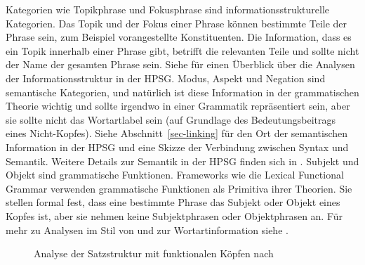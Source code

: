 %
Kategorien wie Topikphrase und Fokusphrase sind informationsstrukturelle Kategorien. Das
Topik und der Fokus einer Phrase können bestimmte Teile der Phrase sein, zum Beispiel vorangestellte Konstituenten. Die
Information, dass es ein Topik innerhalb einer Phrase gibt, betrifft die relevanten Teile und sollte nicht der Name der gesamten Phrase sein. Siehe
 für einen Überblick über die Analysen der Informationsstruktur in der HPSG. Modus,
Aspekt und Negation sind semantische Kategorien, und natürlich ist diese
Information in der grammatischen Theorie wichtig und sollte irgendwo in einer Grammatik repräsentiert sein, aber
sie sollte nicht das Wortartlabel sein (auf Grundlage des Bedeutungsbeitrags eines Nicht-Kopfes). Siehe Abschnitt~\ref{sec-linking} für den Ort der semantischen Information in
der HPSG und eine Skizze der Verbindung zwischen Syntax und Semantik. Weitere Details zur Semantik in
der HPSG finden sich in .
%
Subjekt und Objekt sind grammatische Funktionen.
Frameworks wie die Lexical Functional Grammar verwenden grammatische
Funktionen als Primitiva ihrer Theorien. Sie stellen formal fest, dass eine bestimmte Phrase das Subjekt oder Objekt
eines Kopfes ist, aber sie nehmen keine Subjektphrasen oder Objektphrasen an. Für mehr zu Analysen im Stil von \citeauthor{CR2010a} und zur Wortartinformation siehe .
\begin{figure}
\caption{\label{Abbildung-Remnant-Movement-Satzstruktur}Analyse der Satzstruktur mit funktionalen Köpfen nach \citet[]{Laenzlinger2004a}}
\end{figure}%


